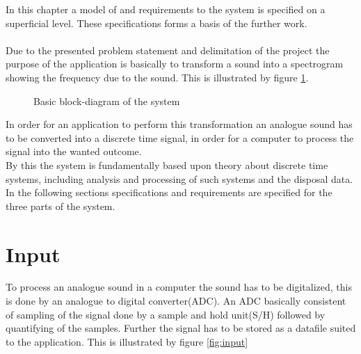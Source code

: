 In this chapter a model of and requirements to the system is specified on a superficial level. These specifications forms a basis of the further work. 
\\ \\
Due to the presented problem statement and delimitation of the project the purpose of the application is basically to transform a sound into a spectrogram showing the frequency due to the sound. This is illustrated by figure \ref{fig:model1}.    
\begin{figure}[h]
\centering
{}
\caption{Basic block-diagram of the system}
\label{fig:model1}
\end{figure}
In order for an application to perform this transformation an analogue sound has to be converted into a discrete time signal, in order for a computer to process the signal into the wanted outcome. \\
By this the system is fundamentally based upon theory about discrete time systems, including analysis and processing of such systems and the disposal data. \\
In the following sections specifications and requirements are specified for the three parts of the system.

\section{Input}
To process an analogue sound in a computer the sound has to be digitalized, this is done by an analogue to digital converter(ADC). An ADC basically consistent of sampling of the signal done by a sample and hold unit(S/H) followed by quantifying of the samples. Further the signal has to be stored as a datafile suited to the application. This is illustrated by figure \ref{fig:input} 

